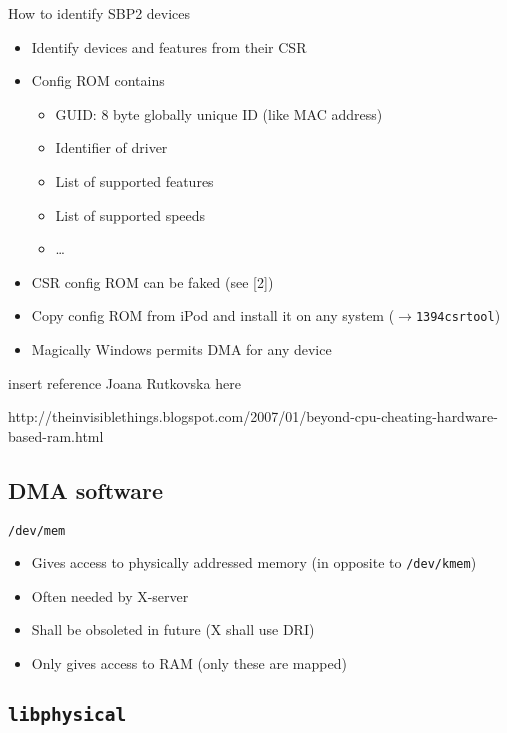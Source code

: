 \documentclass{beamer}
\newenvironment{itemizeframe}[1]
  {\begin{frame}{#1}\startitemizeframe}
  {\stopitemizeframe\end{frame}}
\newcommand\startitemizeframe{\begin{itemize}}
\newcommand\stopitemizeframe{\end{itemize}}
\begin{document}
		\begin{itemizeframe}{How to identify SBP2 devices}
			\item Identify devices and features from their CSR 
			\item Config ROM contains
			\begin{itemize}
				\item GUID: 8 byte globally unique ID (like MAC address)
				\item Identifier of driver
				\item List of supported features
				\item List of supported speeds
				\item \ldots
			\end{itemize}
			\item<2-> CSR config ROM can be faked (see [2])
			\item<3-> Copy config ROM from iPod and install it on any system ($\rightarrow$\texttt{1394csrtool})
			\item<4-> Magically Windows permits DMA for \alert{any} device
		\end{itemizeframe}

		\begin{frame}
			\alert{insert reference Joana Rutkovska here}

			http://theinvisiblethings.blogspot.com/2007/01/beyond-cpu-cheating-hardware-based-ram.html
		\end{frame}
		
	\subsection{DMA software}

		\begin{itemizeframe}{\texttt{/dev/mem}}
			\item Gives access to physically addressed memory (in opposite to \texttt{/dev/kmem})
			\item Often needed by X-server
			\item Shall be obsoleted in future (X shall use DRI)
			\item Only gives access to  RAM (only these are mapped)
		\end{itemizeframe}

	\subsection{\texttt{libphysical}}
\end{document}

